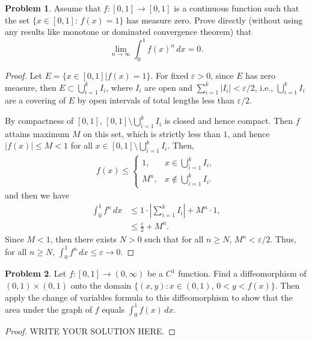 \documentclass[11pt]{article}
\theoremstyle{definition}
\newtheorem{problem}{Problem}
\theoremstyle{definition}
\begin{document}
\begin{problem}
Assume that $f : [0, 1]\to [0, 1]$ is a continuous function such that the set $\{x\in [0, 1] :\,  f(x) = 1\}$ has measure zero. Prove directly (without using any results like monotone or dominated convergence theorem) that
$$\lim_{n\to\infty} \int_0^1 f(x)^n\, dx =0. $$
\end{problem}
\begin{proof}
Let $E = \{x \in [0,1] | f(x) = 1\}$. For fixed $\varepsilon > 0$, since $E$ has zero measure, then $E \subset \bigcup^k_{i=1}I_i$, where $I_i$ are open and $\sum^k_{i=1}|I_i| < \varepsilon/2$, i.e., $\bigcup^k_{i=1}I_i$ are a covering of $E$ by open intervals of total lengths less than $\varepsilon/2$. 

By compactness of $[0,1]$, $[0,1]\setminus \bigcup^k_{i=1}I_i$ is closed and hence compact. Then $f$ attains maximum $M$ on this set, which is strictly less than $1$, and hence $|f(x)| \leq M < 1$ for all $x \in [0,1]\setminus \bigcup^k_{i=1}I_i$. Then,
\begin{align*}
    f(x) \leq \begin{cases}
        1, & x \in \bigcup^k_{i=1}I_i, \\
        M^n, & x \notin \bigcup^k_{i=1}I_i.
    \end{cases}
\end{align*}
and then we have
\begin{align*}
    \int^1_0 f^n\, dx & \leq 1 \cdot \left|\sum^k_{i=1} I_i \right| + M^n \cdot 1, \\
    & \leq \frac{\varepsilon}{2} + M^n.
\end{align*}
Since $M < 1$, then there exists $N > 0$ such that for all $n \geq N$, $M^n < \varepsilon/2$. Thus, for all $n \geq N$, $\int^1_0 f^n\, dx \leq \varepsilon \to 0$.
\end{proof}


\medskip

\begin{problem}
Let $f:[0,1]\to (0,\infty)$ be a $C^1$ function. Find a diffeomorphism of $(0,1)\times(0,1)$ onto the domain
$\{ (x,y): x\in (0,1),\, 0<y<f(x)\}$. Then apply the change of variables formula to this diffeomorphism to show that the area under the graph of $f$ equals
$\int_0^1 f(x)\, dx$.
\end{problem}
\begin{proof}
	WRITE YOUR SOLUTION HERE.
\end{proof}


\medskip
\end{document}
